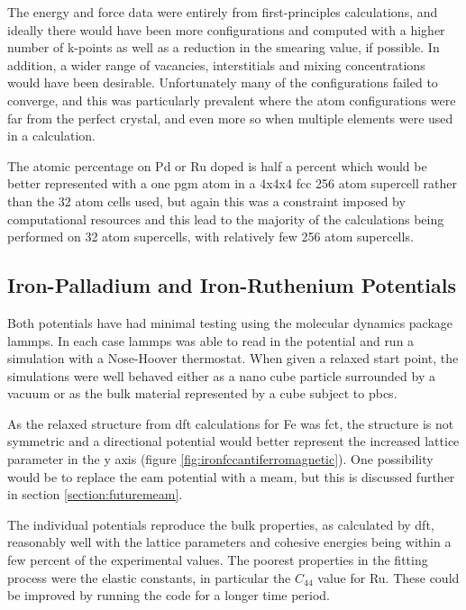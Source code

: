 The energy and force data were entirely from first-principles calculations, and ideally there would have been more configurations and computed with a higher number of k-points as well as a reduction in the smearing value, if possible.  In addition, a wider range of vacancies, interstitials and mixing concentrations would have been desirable.  Unfortunately many of the configurations failed to converge, and this was particularly prevalent where the atom configurations were far from the perfect crystal, and even more so when multiple elements were used in a calculation.

The atomic percentage on Pd or Ru doped is half a percent which would be better represented with a one \acrshort{pgm} atom in a 4x4x4 \acrshort{fcc} 256 atom supercell rather than the 32 atom cells used, but again this was a constraint imposed by computational resources and this lead to the majority of the calculations being performed on 32 atom supercells, with relatively few 256 atom supercells.


\subsection{Iron-Palladium and Iron-Ruthenium Potentials}

Both potentials have had minimal testing using the molecular dynamics package \acrshort{lammps}.  In each case \acrshort{lammps} was able to read in the potential and run a simulation with a Nose-Hoover thermostat.  When given a relaxed start point, the simulations were well behaved either as a nano cube particle surrounded by a vacuum or as the bulk material represented by a cube subject to \acrshort{pbc}s.

As the relaxed structure from \acrshort{dft} calculations for Fe was \acrshort{fct}, the structure is not symmetric and a directional potential would better represent the increased lattice parameter in the y axis (figure \ref{fig:ironfccantiferromagnetic}).  One possibility would be to replace the \acrshort{eam} potential with a \acrshort{meam}, but this is discussed further in section \ref{section:futuremeam}.

The individual potentials reproduce the bulk properties, as calculated by \acrshort{dft}, reasonably well with the lattice parameters and cohesive energies being within a few percent of the experimental values.  The poorest properties in the fitting process were the elastic constants, in particular the $C_{44}$ value for \Gls{Ru}.  These could be improved by running the code for a longer time period.


